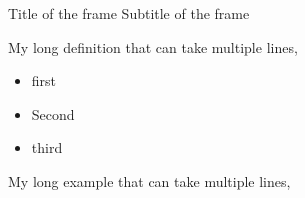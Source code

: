 \documentclass[11pt]{article}
\begin{document}
\begin{frame}
	{Title of the frame}
	{Subtitle of the frame}
	\begin{definition}[My definition]
		My long definition that can take multiple lines, 
	\end{definition}
	
	\begin{itemize}
		\item first
		\item Second
		\item third
	\end{itemize}
	
	\begin{example}[My example]
		My long example that can take multiple lines, 
	\end{example}
	
\end{frame}
\end{document}
